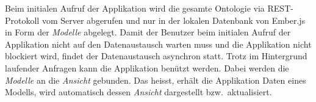 Beim initialen Aufruf der Applikation wird die gesamte Ontologie via REST-Protokoll vom Server abgerufen und nur in der lokalen Datenbank von Ember.js in Form der \textit{Modelle} abgelegt. Damit der Benutzer beim initialen Aufruf der Applikation nicht auf den Datenaustausch warten muss und die Applikation nicht blockiert wird, findet der Datenaustausch asynchron statt. Trotz im  Hintergrund laufender Anfragen kann die Applikation benützt werden. Dabei werden die \textit{Modelle} an die \textit{Ansicht} gebunden. Das heisst, erhält die Applikation Daten eines Modells, wird automatisch dessen \textit{Ansicht} dargestellt bzw.\ aktualisiert.
